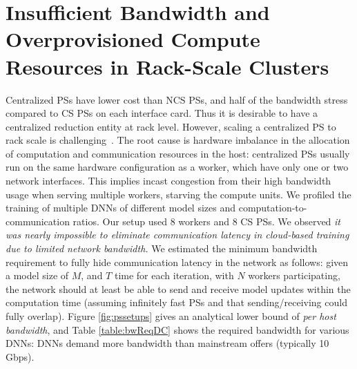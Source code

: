 \section{Insufficient Bandwidth and Overprovisioned Compute Resources in Rack-Scale Clusters}
Centralized PSs have lower cost than NCS PSs, and half of the bandwidth stress compared to CS PSs on each interface card. Thus it is desirable to have a centralized reduction entity at rack level. However, scaling a centralized PS to rack scale is challenging~\cite{firecaffe}.
The root cause is hardware imbalance in the allocation of computation and communication resources in the host: centralized PSs usually run on the same hardware configuration as a worker, which have only one or two network interfaces. This implies incast congestion from their high bandwidth usage when serving multiple workers, starving the compute units. We profiled the training of multiple DNNs of different model sizes and computation-to-communication ratios. Our setup used 8 workers and 8 CS PSs. We observed \textit{it was nearly impossible to eliminate communication latency in cloud-based training due to limited network bandwidth.} We estimated the minimum bandwidth requirement to fully hide communication latency in the network as follows: given a model size of $M$, and $T$ time for each iteration, with $N$ workers participating, the network should at least be able to send and receive model updates within the computation time (assuming infinitely fast PSs and that sending/receiving could fully overlap). Figure \ref{fig:pssetups} gives an analytical lower bound of \textit{per host bandwidth}, and Table \ref{table:bwReqDC} shows the required bandwidth for various DNNs: DNNs demand more bandwidth than mainstream offers (typically 10 Gbps). 


